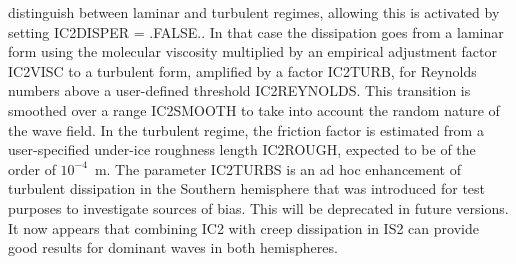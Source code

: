  \cite{art:Aea15} distinguish between laminar and 
turbulent regimes, allowing this is activated by setting  {\code IC2DISPER = .FALSE.}. 
In that case the dissipation goes from a laminar form using the molecular viscosity multiplied by an 
empirical adjustment factor {\code IC2VISC} to a turbulent form, amplified by a factor {\code IC2TURB}, for Reynolds numbers 
above a user-defined threshold {\code IC2REYNOLDS}. This transition is smoothed over a range {\code IC2SMOOTH} to take into 
account the random nature of the wave field. In the turbulent regime, the friction factor 
is estimated from a user-specified under-ice roughness length {\code IC2ROUGH}, expected to be of the order of $10^{-4}$~m. 
The parameter {\code IC2TURBS} is an ad hoc enhancement of turbulent dissipation in the Southern hemisphere 
that was introduced for test purposes to investigate sources of bias. This will be deprecated in future versions. It now appears 
that combining IC2 with creep dissipation in IS2 can provide good results for dominant waves in both hemispheres. 

